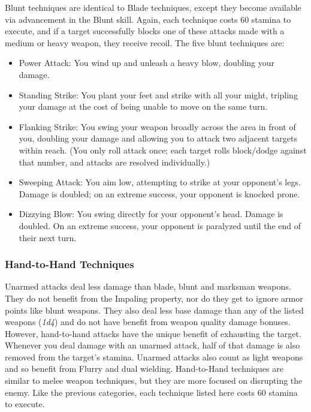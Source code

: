\documentclass[12pt]{book}
\begin{document}
Blunt techniques are identical to Blade techniques, except they become available via advancement in the Blunt skill. Again, each technique costs 60 stamina to execute, and if a target successfully blocks one of these attacks made with a medium or heavy weapon, they receive recoil. The five blunt techniques are:

\begin{itemize}
	\item Power Attack: You wind up and unleash a heavy blow, doubling your damage.
	\item Standing Strike: You plant your feet and strike with all your might, tripling your damage at the cost of being unable to move on the same turn.
	\item Flanking Strike: You swing your weapon broadly across the area in front of you, doubling your damage and allowing you to attack two adjacent targets within reach. (You only roll attack once; each target rolls block/dodge against that number, and attacks are resolved individually.)
	\item Sweeping Attack: You aim low, attempting to strike at your opponent's legs. Damage is doubled; on an extreme success, your opponent is knocked prone.
	\item Dizzying Blow: You swing directly for your opponent's head. Damage is doubled. On an extreme success, your opponent is paralyzed until the end of their next turn.
\end{itemize}

\subsubsection{Hand-to-Hand Techniques}

Unarmed attacks deal less damage than blade, blunt and marksman weapons. They do not benefit from the Impaling property, nor do they get to ignore armor points like blunt weapons. They also deal less base damage than any of the listed weapons (\textit{1d4}) and do not have benefit from weapon quality damage bonuses. However, hand-to-hand attacks have the unique benefit of exhausting the target. Whenever you deal damage with an unarmed attack, half of that damage is also removed from the target's stamina. Unarmed attacks also count as light weapons and so benefit from Flurry and dual wielding. Hand-to-Hand techniques are similar to melee weapon techniques, but they are more focused on disrupting the enemy. Like the previous categories, each technique listed here costs 60 stamina to execute.
\end{document}
